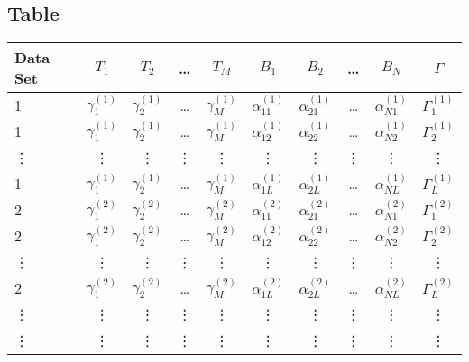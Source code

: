 \documentclass{article}
\begin{document}
\subsection{Table}

\begin{table}[H]
\centering
\begin{tabular}{||l||c|c|c|c||c|c|c|c|c||}
\hline
Data Set & $T_1$            & $T_2$            & \dots    & $T_M$            & $B_1$               & $B_2$               & \dots  & $B_N$                & $\Gamma$         \\
\hline
1        & $\gamma_1^{(1)}$ & $\gamma_2^{(1)}$ & \dots    & $\gamma_M^{(1)}$ & $\alpha_{11}^{(1)}$ & $\alpha_{21}^{(1)}$ & \dots  & $\alpha_{N1}^{(1)}$  & $\Gamma_1^{(1)}$ \\
1        & $\gamma_1^{(1)}$ & $\gamma_2^{(1)}$ & \dots    & $\gamma_M^{(1)}$ & $\alpha_{12}^{(1)}$ & $\alpha_{22}^{(1)}$ & \dots  & $\alpha_{N2}^{(1)}$  & $\Gamma_2^{(1)}$ \\
\vdots   & \vdots           & \vdots           & \vdots   & \vdots           & \vdots              & \vdots              & \vdots & \vdots               & \vdots         \\
1        & $\gamma_1^{(1)}$ & $\gamma_2^{(1)}$ & \dots    & $\gamma_M^{(1)}$ & $\alpha_{1L}^{(1)}$ & $\alpha_{2L}^{(1)}$ & \dots  & $\alpha_{NL}^{(1)}$  & $\Gamma_L^{(1)}$ \\
\hline
2        & $\gamma_1^{(2)}$ & $\gamma_2^{(2)}$ & \dots    & $\gamma_M^{(2)}$ & $\alpha_{11}^{(2)}$ & $\alpha_{21}^{(2)}$ & \dots  & $\alpha_{N1}^{(2)}$  & $\Gamma_1^{(2)}$ \\
2        & $\gamma_1^{(2)}$ & $\gamma_2^{(2)}$ & \dots    & $\gamma_M^{(2)}$ & $\alpha_{12}^{(2)}$ & $\alpha_{22}^{(2)}$ & \dots  & $\alpha_{N2}^{(2)}$  & $\Gamma_2^{(2)}$ \\
\vdots   & \vdots           & \vdots           & \vdots   & \vdots           & \vdots              & \vdots              & \vdots & \vdots               & \vdots         \\
2        & $\gamma_1^{(2)}$ & $\gamma_2^{(2)}$ & \dots    & $\gamma_M^{(2)}$ & $\alpha_{1L}^{(2)}$ & $\alpha_{2L}^{(2)}$ & \dots  & $\alpha_{NL}^{(2)}$  & $\Gamma_L^{(2)}$ \\
\hline
\vdots   & \vdots           & \vdots           & \vdots   & \vdots           & \vdots              & \vdots              & \vdots & \vdots               & \vdots         \\
\vdots   & \vdots           & \vdots           & \vdots   & \vdots           & \vdots              & \vdots              & \vdots & \vdots               & \vdots         \\

\end{tabular}
\end{table}
\end{document}
